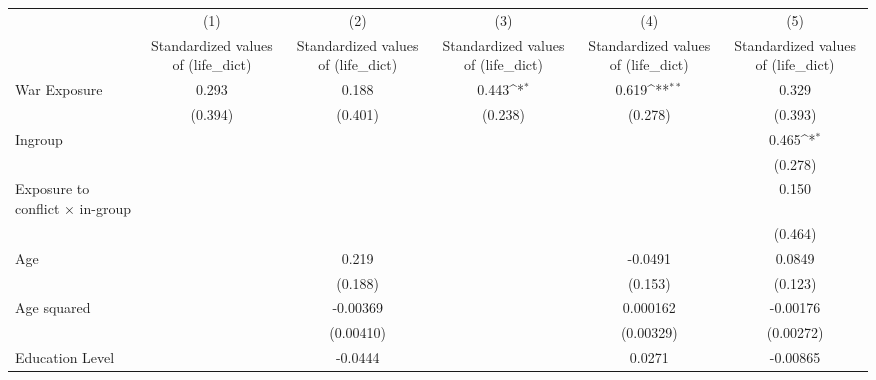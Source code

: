 {
\def\sym#1{\ifmmode^{#1}\else\(^{#1}\)\fi}
\begin{tabular}{l*{5}{c}}
\hline\hline
                    &\multicolumn{1}{c}{(1)}&\multicolumn{1}{c}{(2)}&\multicolumn{1}{c}{(3)}&\multicolumn{1}{c}{(4)}&\multicolumn{1}{c}{(5)}\\
                    &\multicolumn{1}{c}{Standardized values of (life\_dict)     }&\multicolumn{1}{c}{Standardized values of (life\_dict)     }&\multicolumn{1}{c}{Standardized values of (life\_dict)     }&\multicolumn{1}{c}{Standardized values of (life\_dict)     }&\multicolumn{1}{c}{Standardized values of (life\_dict)     }\\
\hline
War Exposure        &       0.293         &       0.188         &       0.443\sym{*}  &       0.619\sym{**} &       0.329         \\
                    &     (0.394)         &     (0.401)         &     (0.238)         &     (0.278)         &     (0.393)         \\
[1em]
Ingroup             &                     &                     &                     &                     &       0.465\sym{*}  \\
                    &                     &                     &                     &                     &     (0.278)         \\
[1em]
Exposure to conflict × in-group &                     &                     &                     &                     &       0.150         \\
                    &                     &                     &                     &                     &     (0.464)         \\
[1em]
Age                 &                     &       0.219         &                     &     -0.0491         &      0.0849         \\
                    &                     &     (0.188)         &                     &     (0.153)         &     (0.123)         \\
[1em]
Age squared         &                     &    -0.00369         &                     &    0.000162         &    -0.00176         \\
                    &                     &   (0.00410)         &                     &   (0.00329)         &   (0.00272)         \\
[1em]
Education Level     &                     &     -0.0444         &                     &      0.0271         &    -0.00865         \\

\end{tabular}}
